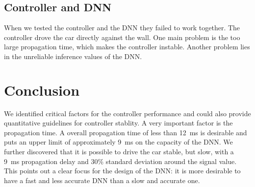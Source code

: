 \documentclass[10pt,a4paper,twoside,journal]{IEEEtran}
\begin{document}
\subsection{Controller and DNN}

When we tested the controller and the DNN they failed to work together. The controller drove the car directly against the wall. One main problem is the too large propagation time, which makes the controller instable. Another problem lies in the unreliable inference values of the DNN.


\section{Conclusion}
\label{sc:conclusion}
We identified critical factors for the controller performance and could also provide quantitative guidelines for controller stablity. A very important factor is the propagation time. A overall propagation time of less than \SI{12}{\milli\second} is desirable and puts an upper limit of approximately \SI{9}{\milli\second} on the capacity of the DNN. We further discovered that it is possible to drive the car stable, but slow, with a \SI{9}{\milli\second} propagation delay and 30\% standard deviation around the signal value. This points out a clear focus for the design of the DNN: it is more desirable to have a fast and less accurate DNN than a slow and accurate one. \\
\end{document}

